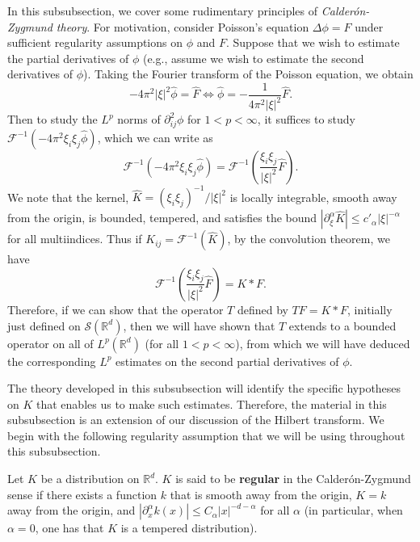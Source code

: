 \documentclass{article}
\begin{document}
In this subsubsection, we cover some rudimentary principles of \textit{Calder{\'o}n-Zygmund theory}. For motivation, consider Poisson's equation $\Delta \phi = F$ under sufficient regularity assumptions on $\phi$ and $F$. Suppose that we wish to estimate the partial derivatives of $\phi$ (e.g., assume we wish to estimate the second derivatives of $\phi$). Taking the Fourier transform of the Poisson equation, we obtain 
\begin{equation*}
	-4\pi^{2}|\xi|^{2}\hat{\phi} = \hat{F} \iff \hat{\phi} = -\frac{1}{4\pi^{2}|\xi|^{2}}\hat{F}. 
\end{equation*}
Then to study the $L^{p}$ norms of $\partial_{ij}^{2}\phi$ for $1 < p < \infty$, it suffices to study $\mathcal{F}^{-1}(-4\pi^{2}\xi_{i}\xi_{j}\hat{\phi})$, which we can write as
\begin{equation*}
	\mathcal{F}^{-1}\left(-4\pi^{2}\xi_{i}\xi_{j}\hat{\phi}\right) = \mathcal{F}^{-1}\left(\frac{\xi_{i}\xi_{j}}{|\xi|^{2}}\hat{F}\right). 
\end{equation*} 
We note that the kernel, $\hat{K} = (\xi_{i}\xi_{j})^{-1}/|\xi|^{2}$ is locally integrable, smooth away from the origin, is bounded, tempered, and satisfies the bound $|\partial_{\xi}^{\alpha}\hat{K}| \leq c'_{\alpha}|\xi|^{-\alpha}$ for all multiindices. Thus if $K_{ij} = \mathcal{F}^{-1}(\hat{K})$, by the convolution theorem, we have 
\begin{equation*}
	\mathcal{F}^{-1}\left(\frac{\xi_{i}\xi_{j}}{|\xi|^{2}}\hat{F}\right) = K \ast F. 
\end{equation*} 
Therefore, if we can show that the operator $T$ defined by $TF = K \ast F$, initially just defined on $\mathcal{S}(\mathbb{R}^{d})$, then we will have shown that $T$ extends to a bounded operator on all of $L^{p}(\mathbb{R}^{d})$ (for all $1 < p < \infty$), from which we will have deduced the corresponding $L^{p}$ estimates on the second partial derivatives of $\phi$. 

The theory developed in this subsubsection will identify the specific hypotheses on $K$ that enables us to make such estimates. Therefore, the material in this subsubsection is an extension of our discussion of the Hilbert transform.  We begin with the following regularity assumption that we will be using throughout this subsubsection. 

\begin{definition}
	Let $K$ be a distribution on $\mathbb{R}^{d}$. $K$ is said to be \textbf{regular} in the Calder{\'o}n-Zygmund sense if there exists a function $k$ that is smooth away from the origin, $K = k$ away from the origin, and $|\partial_{x}^{\alpha}k(x)| \leq C_{\alpha}|x|^{-d-\alpha}$ for all $\alpha$ (in particular, when $\alpha = 0$, one has that $K$ is a tempered distribution). 
\end{definition} 
\end{document}

